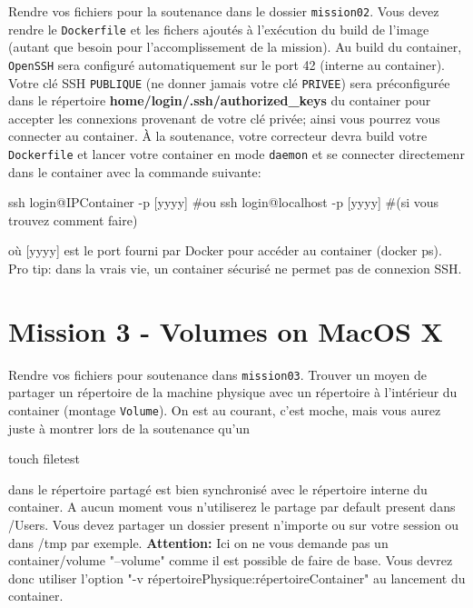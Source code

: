 \documentclass{42}
\begin{document}
Rendre vos fichiers pour la soutenance dans le dossier \texttt{mission02}. Vous devez rendre le \texttt{Dockerfile} et les fichers ajoutés à l'exécution du build de l'image (autant que besoin pour l'accomplissement de la mission).
\newline
\newline
Au build du container, \texttt{OpenSSH} sera configuré automatiquement sur le port 42 (interne au container). Votre clé SSH \texttt{PUBLIQUE} (ne donner jamais votre clé \texttt{PRIVEE}) sera préconfigurée dans le répertoire \textbf{home/login/.ssh/authorized\_keys} du container pour accepter les connexions provenant de votre clé privée; ainsi vous pourrez vous connecter au container.
\newline
\newline
À la soutenance, votre correcteur devra build votre \texttt{Dockerfile} et lancer votre container en mode \texttt{daemon} et se connecter directemenr dans le container avec la commande suivante:
\begin{42console}
ssh login@IPContainer -p [yyyy] #ou
ssh login@localhost -p [yyyy] #(si vous trouvez comment faire)
\end{42console}
où [yyyy] est le port fourni par Docker pour accéder au container (docker ps).
\newline
\newline
\info
{
	Pro tip: dans la vrais vie, un container sécurisé ne permet pas de connexion SSH.
}

	\newpage

\section{Mission 3 - Volumes on MacOS X}

Rendre vos fichiers pour soutenance dans \texttt{mission03}.
\newline
\newline
Trouver un moyen de partager un répertoire de la machine physique avec un répertoire à l'intérieur du container (montage \texttt{Volume}).
On est au courant, c’est moche, mais vous aurez juste à montrer lors de la soutenance qu’un
\begin{42console}
	touch filetest
\end{42console}
dans le répertoire partagé est bien synchronisé avec le répertoire interne du container.
\newline
\newline
A aucun moment vous n'utiliserez le partage par default present dans /Users. Vous devez partager un dossier present n'importe ou sur votre session ou dans /tmp par exemple.
\newline
\warn
{
\textbf{Attention:} Ici on ne vous demande pas un container/volume "--volume" comme il est possible de faire de base. Vous devrez donc utiliser l’option
"-v répertoirePhysique:répertoireContainer" au lancement du container.
}
\end{document}
